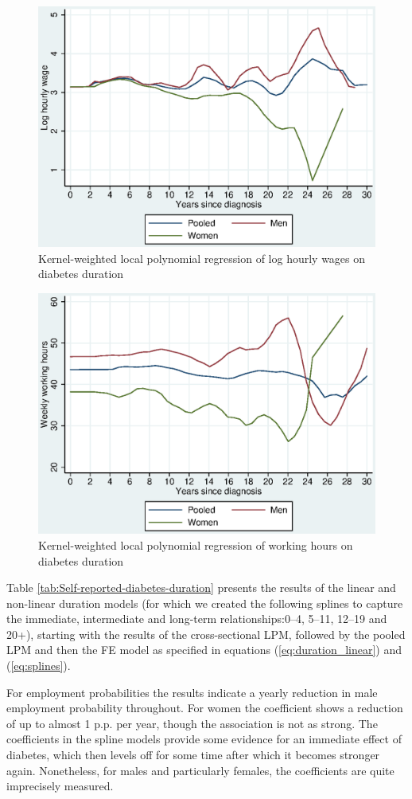 \documentclass[12pt,english]{article}
\begin{document}
{\begin{figure}[h!]
\caption{\label{fig:Kernel-weighted-local-polynomial_wage}Kernel-weighted local
polynomial regression of log hourly wages on diabetes duration}%
\begin{center}
\includegraphics[width=0.5\columnwidth]{figures/lpoly_wage_diabetesduration/lpoly_wage_diabetesduration.eps}
\end{center}
\end{figure}

\begin{figure}[h!]
\caption{\label{fig:Kernel-weighted-local-polynomial_workhrs}Kernel-weighted local
polynomial regression of working hours on diabetes duration}%
\begin{center}
\includegraphics[width=0.5\columnwidth]{figures/lpoly_workhrs_diabetesduration/lpoly_workhrs_diabetesduration.eps}
\end{center}
\end{figure}

\FloatBarrier

Table \ref{tab:Self-reported-diabetes-duration} presents the results of the linear and non-linear duration models (for which we created the following splines to capture the immediate, intermediate and long-term relationships:0--4,
5--11, 12--19 and 20+), starting with the results of the cross-sectional \ac{LPM}, followed by the pooled \ac{LPM} and then the \ac{FE} model as specified in equations (\ref{eq:duration_linear}) and (\ref{eq:splines}).

For employment probabilities the results indicate a yearly reduction in male employment probability throughout. For women the coefficient shows a reduction of up to almost 1 \ac{p.p.} per year, though the association is not as strong. The coefficients in the spline models provide some evidence for an immediate effect of diabetes, which then levels off for some time after which it becomes stronger again. Nonetheless, for males and particularly females, the coefficients are quite imprecisely measured.

}
\end{document}
